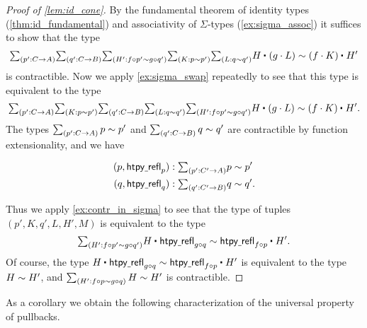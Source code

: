 \begin{proof}[Proof of \cref{lem:id_cone}]
By the fundamental theorem of identity types (\cref{thm:id_fundamental}) and associativity of $\Sigma$-types (\cref{ex:sigma_assoc}) it suffices to show that the type
\begin{equation*}
\sm{p':C\to A}{q':C\to B}{H':f\circ p'\htpy g\circ q'}{K:p\htpy p'}{L:q\htpy q'} \ct{H}{(g\cdot L)} \htpy \ct{(f\cdot K)}{H'}
\end{equation*}
is contractible. Now we apply \cref{ex:sigma_swap} repeatedly to see that this type is equivalent to the type
\begin{equation*}
\sm{p':C\to A}{K: p\htpy p'}{q':C\to B}{L: q\htpy q'}{H':f\circ p'\htpy g\circ q'} \ct{H}{(g\cdot L)} \htpy \ct{(f\cdot K)}{H'}.
\end{equation*}
The types $\sm{p':C\to A} p\htpy p'$ and $\sm{q':C\to B} q\htpy q'$ are contractible by function extensionality, and  we have
\begin{samepage}
\begin{align*}
(p,\mathsf{htpy\usc{}refl}_p) & : \sm{p':C'\to A} p\htpy p' \\
(q,\mathsf{htpy\usc{}refl}_q) & : \sm{q':C'\to B} q\htpy q'.
\end{align*}%
\end{samepage}%
Thus we apply \cref{ex:contr_in_sigma} to see that the type of tuples $(p',K,q',L,H',M)$ is equivalent to the type
\begin{equation*}
\sm{H':f\circ p'\htpy g\circ q'} \ct{H}{\mathsf{htpy\usc{}refl}_{g\circ q}}\htpy \ct{\mathsf{htpy\usc{}refl}_{f\circ p}}{H'}.
\end{equation*}
Of course, the type $\ct{H}{\mathsf{htpy\usc{}refl}_{g\circ q}}\htpy \ct{\mathsf{htpy\usc{}refl}_{f\circ p}}{H'}$ is equivalent to the type $H\sim H'$, and $\sm{H':f\circ p\htpy g\circ q} H\htpy H'$ is contractible.
\end{proof}

As a corollary we obtain the following characterization of the universal property of pullbacks.

